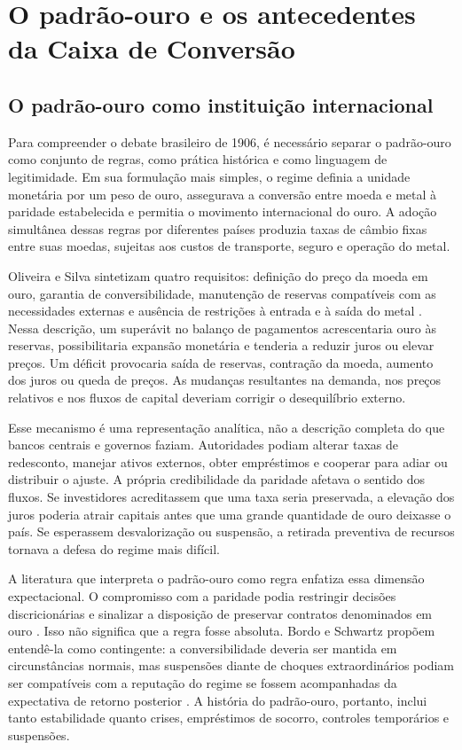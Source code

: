 \chapter{O padrão-ouro e os antecedentes da Caixa de Conversão}

\section{O padrão-ouro como instituição internacional}

Para compreender o debate brasileiro de 1906, é necessário separar o padrão-ouro como conjunto de regras, como prática histórica e como linguagem de legitimidade. Em sua formulação mais simples, o regime definia a unidade monetária por um peso de ouro, assegurava a conversão entre moeda e metal à paridade estabelecida e permitia o movimento internacional do ouro. A adoção simultânea dessas regras por diferentes países produzia taxas de câmbio fixas entre suas moedas, sujeitas aos custos de transporte, seguro e operação do metal.

Oliveira e Silva sintetizam quatro requisitos: definição do preço da moeda em ouro, garantia de conversibilidade, manutenção de reservas compatíveis com as necessidades externas e ausência de restrições à entrada e à saída do metal \cite{oliveirasilva2001}. Nessa descrição, um superávit no balanço de pagamentos acrescentaria ouro às reservas, possibilitaria expansão monetária e tenderia a reduzir juros ou elevar preços. Um déficit provocaria saída de reservas, contração da moeda, aumento dos juros ou queda de preços. As mudanças resultantes na demanda, nos preços relativos e nos fluxos de capital deveriam corrigir o desequilíbrio externo.

Esse mecanismo é uma representação analítica, não a descrição completa do que bancos centrais e governos faziam. Autoridades podiam alterar taxas de redesconto, manejar ativos externos, obter empréstimos e cooperar para adiar ou distribuir o ajuste. A própria credibilidade da paridade afetava o sentido dos fluxos. Se investidores acreditassem que uma taxa seria preservada, a elevação dos juros poderia atrair capitais antes que uma grande quantidade de ouro deixasse o país. Se esperassem desvalorização ou suspensão, a retirada preventiva de recursos tornava a defesa do regime mais difícil.

A literatura que interpreta o padrão-ouro como regra enfatiza essa dimensão expectacional. O compromisso com a paridade podia restringir decisões discricionárias e sinalizar a disposição de preservar contratos denominados em ouro \cite{bordokydland1990}. Isso não significa que a regra fosse absoluta. Bordo e Schwartz propõem entendê-la como contingente: a conversibilidade deveria ser mantida em circunstâncias normais, mas suspensões diante de choques extraordinários podiam ser compatíveis com a reputação do regime se fossem acompanhadas da expectativa de retorno posterior \cite{bordoschwartz1994}. A história do padrão-ouro, portanto, inclui tanto estabilidade quanto crises, empréstimos de socorro, controles temporários e suspensões.

